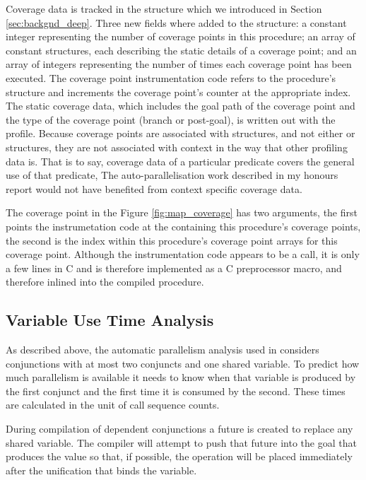 Coverage data is tracked in the \PS structure
which we introduced in Section \ref{sec:backgnd_deep}.
Three new fields where added to the \PS structure:
a constant integer representing the number of coverage points in this
procedure;
an array of constant structures,
each describing the static details of a coverage point;
and an array of integers representing the number of times each coverage
point has been executed.
The coverage point instrumentation code refers to the procedure's \PS
structure and increments the coverage point's counter at the appropriate index.
The static coverage data,
which includes the goal path of the coverage point and the type of the
coverage point (branch or post-goal),
is written out with the profile.
Because coverage points are associated with \PS structures,
and not either \PD or \CSD structures,
they are not associated with context in the way that other profiling
data is.
That is to say,
coverage data of a particular predicate covers the general use of that
predicate,
The auto-parallelisation work described in my honours report
\citep{bone:2008:hons}
would not have benefited from context specific coverage data.

The coverage point in the Figure \ref{fig:map_coverage}
has two arguments,
the first points the instrumetation code at the \PS containing
this procedure's coverage points,
the second is the index within this procedure's coverage point arrays
for this coverage point.
Although the instrumentation code appears to be a call,
it is only a few lines in C and is therefore implemented as a C
preprocessor macro, and therefore inlined into the compiled procedure. 


\subsection{Variable Use Time Analysis}
\label{sec:var_use_time}

As described above,
the automatic parallelism analysis used in \citet{bone:2008:hons} considers
conjunctions with at most two conjuncts and one shared variable.
To predict how much parallelism is available it needs to know
when that variable is produced by the first conjunct
and the first time it is consumed by the second.
These times are calculated in the unit of call sequence counts.

During compilation of dependent conjunctions a future is created to
replace any shared variable.
The compiler will attempt to push that future into the goal that
produces the value so that,
if possible,
the \signal operation will be placed immediately after the unification
that binds the variable.

